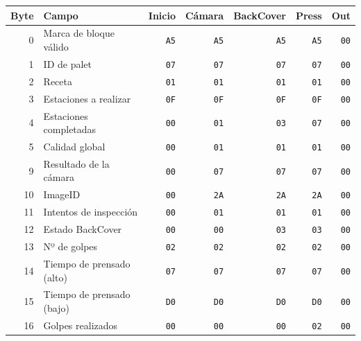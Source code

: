\begin{tabular}{r l r r r r r}
\toprule
Byte & Campo & \textbf{Inicio} & \textbf{Cámara} & \textbf{BackCover} & \textbf{Press} & \textbf{Out} \\
\midrule
0 & Marca de bloque válido & \texttt{A5} & \texttt{A5} & \texttt{A5} & \texttt{A5} & \cellcolor{naranja!25}\texttt{00} \\
1 & ID de palet & \texttt{07} & \texttt{07} & \texttt{07} & \texttt{07} & \cellcolor{naranja!25}\texttt{00} \\
2 & Receta & \texttt{01} & \texttt{01} & \texttt{01} & \texttt{01} & \cellcolor{naranja!25}\texttt{00} \\
3 & Estaciones a realizar & \texttt{0F} & \texttt{0F} & \texttt{0F} & \texttt{0F} & \cellcolor{naranja!25}\texttt{00} \\
4 & Estaciones completadas & \texttt{00} & \cellcolor{naranja!25}\texttt{01} & \cellcolor{naranja!25}\texttt{03} & \cellcolor{naranja!25}\texttt{07} & \cellcolor{naranja!25}\texttt{00} \\
5 & Calidad global & \texttt{00} & \cellcolor{naranja!25}\texttt{01} & \texttt{01} & \texttt{01} & \cellcolor{naranja!25}\texttt{00} \\
9 & Resultado de la cámara & \texttt{00} & \cellcolor{naranja!25}\texttt{07} & \texttt{07} & \texttt{07} & \cellcolor{naranja!25}\texttt{00} \\
10 & ImageID & \texttt{00} & \cellcolor{naranja!25}\texttt{2A} & \texttt{2A} & \texttt{2A} & \cellcolor{naranja!25}\texttt{00} \\
11 & Intentos de inspección & \texttt{00} & \cellcolor{naranja!25}\texttt{01} & \texttt{01} & \texttt{01} & \cellcolor{naranja!25}\texttt{00} \\
12 & Estado BackCover & \texttt{00} & \texttt{00} & \cellcolor{naranja!25}\texttt{03} & \texttt{03} & \cellcolor{naranja!25}\texttt{00} \\
13 & Nº de golpes & \texttt{02} & \texttt{02} & \texttt{02} & \texttt{02} & \cellcolor{naranja!25}\texttt{00} \\
14 & Tiempo de prensado (alto) & \texttt{07} & \texttt{07} & \texttt{07} & \texttt{07} & \cellcolor{naranja!25}\texttt{00} \\
15 & Tiempo de prensado (bajo) & \texttt{D0} & \texttt{D0} & \texttt{D0} & \texttt{D0} & \cellcolor{naranja!25}\texttt{00} \\
16 & Golpes realizados & \texttt{00} & \texttt{00} & \texttt{00} & \cellcolor{naranja!25}\texttt{02} & \cellcolor{naranja!25}\texttt{00} \\
\bottomrule
\end{tabular}
